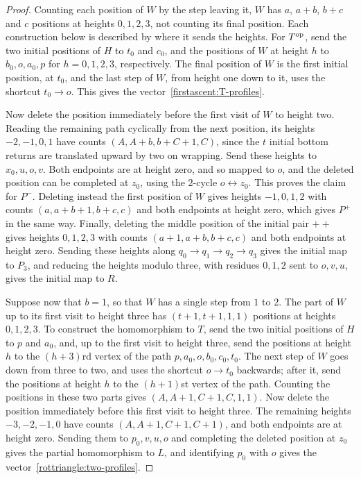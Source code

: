 \begin{proof}
Counting each position of $W$ by the step leaving it, $W$ has $a$, $a+b$, $b+c$ and $c$ positions at heights $0,1,2,3$, not counting its final position. Each construction below is described by where it sends the heights.
For $T^{\rm op}$, send the two initial positions of $H$ to $t_0$ and $c_0$, and the positions of $W$ at height $h$ to $b_0,o,a_0,p$ for $h=0,1,2,3$, respectively. The final position of $W$ is the first initial position, at $t_0$, and the last step of $W$, from height one down to it, uses the shortcut $t_0\to o$. This gives the vector~\eqref{firstascent:T-profiles}.

Now delete the position immediately before the first visit of $W$ to height two.
Reading the remaining path cyclically from the next position, its heights
$-2,-1,0,1$ have counts $(A,A+b,b+C+1,C)$, since the $t$ initial
bottom returns are translated upward by two on wrapping.
Send these heights to $x_0,u,o,v$. Both endpoints are at height zero, and so mapped to $o$, and the deleted position can be completed at $z_0$, using the $2$-cycle $o\leftrightarrow z_0$. This proves the claim for $P^-$.
Deleting instead the first position of $W$ gives heights $-1,0,1,2$
with counts $(a,a+b+1,b+c,c)$ and both endpoints at height zero, which
gives $P^+$ in the same way.
Finally, deleting the middle position of the initial pair $++$ gives heights $0,1,2,3$
with counts $(a+1,a+b,b+c,c)$ and both endpoints at height zero. Sending these heights along $q_0\to q_1\to q_2\to q_3$ gives the initial map to $P_3$, and reducing
the heights modulo three, with residues $0,1,2$ sent to $o,v,u$, gives the initial map to $R$.

Suppose now that $b=1$, so that $W$ has a single step from $1$ to $2$. The part of $W$ up to its first visit to height three has
$(t+1,t+1,1,1)$ positions at heights $0,1,2,3$. To construct the homomorphism to $T$, send the
two initial positions of $H$ to $p$ and $a_0$, and, up to the first visit to height three, send the positions at height
$h$ to the $(h+3)$rd vertex of the path $p,a_0,o,b_0,c_0,t_0$. The next step of $W$ goes down from three to two, and uses the shortcut $o\to t_0$ backwards; after it, send the positions at height $h$ to the $(h+1)$st vertex of the path. Counting
the positions in these two parts gives $(A,A+1,C+1,C,1,1)$.
Now delete the position immediately before this first visit to height three. The remaining heights
$-3,-2,-1,0$ have counts $(A,A+1,C+1,C+1)$, and both endpoints
are at height zero. Sending them to $p_0,v,u,o$ and completing the deleted position at $z_0$
gives the partial homomorphism to $L$, and identifying $p_0$ with $o$ gives the vector~\eqref{rottriangle:two-profiles}.
\end{proof}

